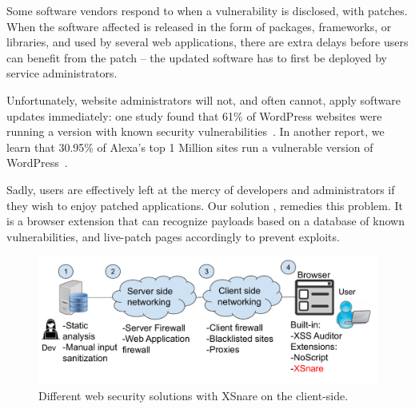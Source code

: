 Some software vendors respond to \xss when a vulnerability is
disclosed, with patches. When the software affected is released in
the form of packages, frameworks, or libraries, and used by several
web applications, there are extra delays before users can benefit from
the patch -- the updated software has to first be deployed by service
administrators.

Unfortunately, website administrators will not, and often cannot,
apply software updates immediately: one study found
that 61\% of WordPress websites were running a version with known
security vulnerabilities~\cite{Sucuri}. In another report, we learn
that 30.95\% of Alexa's top 1 Million sites run a vulnerable version
of WordPress~\cite{wpwhitesecurity}.

Sadly, users are effectively left at the mercy of developers and
administrators if they wish to enjoy patched applications. Our
solution \sys, remedies this problem. It is a browser extension that
can recognize \xss payloads based on a database of known
vulnerabilities, and live-patch pages accordingly to prevent exploits.


\begin{figure}[h]
  \includegraphics[scale=0.37]{img/web_app_architecture_one.pdf}
  \vspace*{-5.0ex}
  \caption{Different web security solutions with XSnare on the client-side.}
  \label{fig:web_architecture}
\end{figure}

